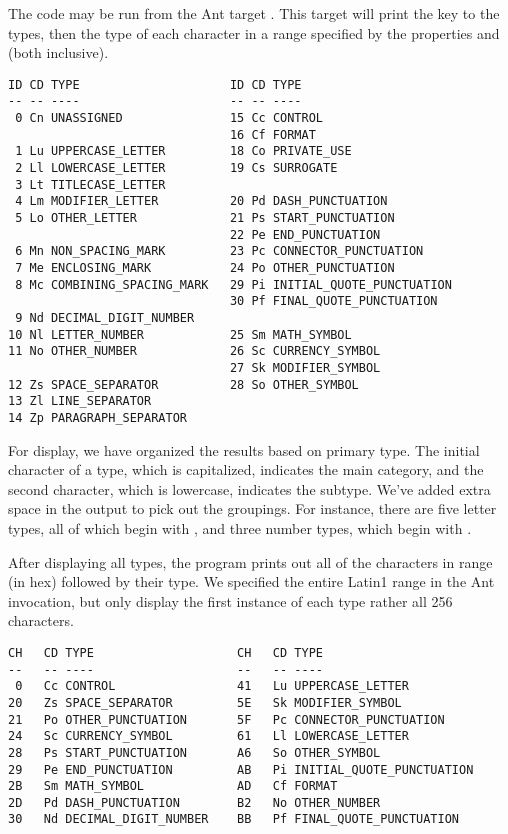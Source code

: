 The code may be run from the Ant target .
This target will print the key to the types, then the type of
each character in a range specified by the properties 
 and  (both inclusive).
%
%
%
\begin{verbatim}
ID CD TYPE                     ID CD TYPE
-- -- ----                     -- -- ----
 0 Cn UNASSIGNED               15 Cc CONTROL
                               16 Cf FORMAT
 1 Lu UPPERCASE_LETTER         18 Co PRIVATE_USE
 2 Ll LOWERCASE_LETTER         19 Cs SURROGATE
 3 Lt TITLECASE_LETTER         
 4 Lm MODIFIER_LETTER          20 Pd DASH_PUNCTUATION
 5 Lo OTHER_LETTER             21 Ps START_PUNCTUATION
                               22 Pe END_PUNCTUATION
 6 Mn NON_SPACING_MARK         23 Pc CONNECTOR_PUNCTUATION
 7 Me ENCLOSING_MARK           24 Po OTHER_PUNCTUATION
 8 Mc COMBINING_SPACING_MARK   29 Pi INITIAL_QUOTE_PUNCTUATION
                               30 Pf FINAL_QUOTE_PUNCTUATION
 9 Nd DECIMAL_DIGIT_NUMBER     
10 Nl LETTER_NUMBER            25 Sm MATH_SYMBOL
11 No OTHER_NUMBER             26 Sc CURRENCY_SYMBOL
                               27 Sk MODIFIER_SYMBOL
12 Zs SPACE_SEPARATOR          28 So OTHER_SYMBOL
13 Zl LINE_SEPARATOR           
14 Zp PARAGRAPH_SEPARATOR      
\end{verbatim}
%
For display, we have organized the results based on primary type.  The
initial character of a type, which is capitalized, indicates the main
category, and the second character, which is lowercase, indicates the
subtype.  We've added extra space in the output to pick out the
groupings.  For instance, there are five letter types, all of which
begin with , and three number types, which begin with
.

After displaying all types, the program prints out all of the
characters in range (in hex) followed by their type.  We specified the
entire Latin1 range in the Ant invocation, but only display the first
instance of each type rather all 256 characters.
%
\begin{verbatim}
CH   CD TYPE                    CH   CD TYPE
--   -- ----                    --   -- ----
 0   Cc CONTROL                 41   Lu UPPERCASE_LETTER
20   Zs SPACE_SEPARATOR         5E   Sk MODIFIER_SYMBOL
21   Po OTHER_PUNCTUATION       5F   Pc CONNECTOR_PUNCTUATION
24   Sc CURRENCY_SYMBOL         61   Ll LOWERCASE_LETTER
28   Ps START_PUNCTUATION       A6   So OTHER_SYMBOL
29   Pe END_PUNCTUATION         AB   Pi INITIAL_QUOTE_PUNCTUATION
2B   Sm MATH_SYMBOL             AD   Cf FORMAT
2D   Pd DASH_PUNCTUATION        B2   No OTHER_NUMBER
30   Nd DECIMAL_DIGIT_NUMBER    BB   Pf FINAL_QUOTE_PUNCTUATION
\end{verbatim}
%

